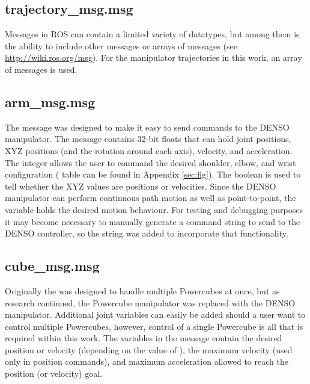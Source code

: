 \subsection{trajectory\_msg.msg}
\label{sec:trajmsg}
Messages in ROS can contain a limited variety of datatypes, but among them is the ability to include other messages or arrays of messages (see \url{http://wiki.ros.org/msg}). For the manipulator trajectories in this work, an array of  messages is used.\\

\subsection{arm\_msg.msg}
The  message was designed to make it easy to send commands to the DENSO manipulator. The message contains 32-bit floats that can hold joint positions, XYZ positions (and the rotation around each axis), velocity, and acceleration. The  integer allows the user to command the desired shoulder, elbow, and wrist configuration ( table can be found in Appendix \ref{sec:fig}). The  boolean is used to tell  whether the XYZ values are positions or velocities. Since the DENSO manipulator can perform continuous path motion as well as point-to-point, the  variable holds the desired motion behaviour. For testing and debugging purposes it may become necessary to manually generate a command string to send to the DENSO controller, so the string  was added to incorporate that functionality.\\

\subsection{cube\_msg.msg}
Originally the  was designed to handle multiple Powercubes at once, but as research continued, the Powercube manipulator was replaced with the DENSO manipulator. Additional joint variables can easily be added should a user want to control multiple Powercubes, however, control of a single Powercube is all that is required within this work. The variables in the  message contain the desired position or velocity (depending on the value of ), the maximum velocity (used only in position commands), and maximum acceleration allowed to reach the position (or velocity) goal.\\

